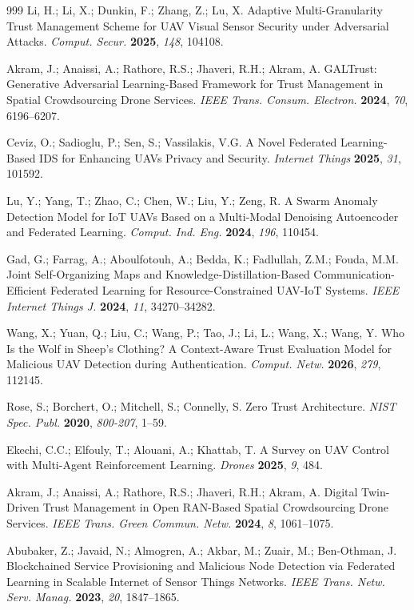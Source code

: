 \documentclass[notspecified,article,submit,moreauthors]{Definitions/mdpi}
\begin{document}
\begin{thebibliography}{999}
Li, H.; Li, X.; Dunkin, F.; Zhang, Z.; Lu, X. Adaptive Multi-Granularity Trust Management Scheme for UAV Visual Sensor Security under Adversarial Attacks. {\em Comput. Secur.} {\bf 2025}, {\em 148}, 104108.

Akram, J.; Anaissi, A.; Rathore, R.S.; Jhaveri, R.H.; Akram, A. GALTrust: Generative Adversarial Learning-Based Framework for Trust Management in Spatial Crowdsourcing Drone Services. {\em IEEE Trans. Consum. Electron.} {\bf 2024}, {\em 70}, 6196--6207.

Ceviz, O.; Sadioglu, P.; Sen, S.; Vassilakis, V.G. A Novel Federated Learning-Based IDS for Enhancing UAVs Privacy and Security. {\em Internet Things} {\bf 2025}, {\em 31}, 101592.

Lu, Y.; Yang, T.; Zhao, C.; Chen, W.; Liu, Y.; Zeng, R. A Swarm Anomaly Detection Model for IoT UAVs Based on a Multi-Modal Denoising Autoencoder and Federated Learning. {\em Comput. Ind. Eng.} {\bf 2024}, {\em 196}, 110454.

Gad, G.; Farrag, A.; Aboulfotouh, A.; Bedda, K.; Fadlullah, Z.M.; Fouda, M.M. Joint Self-Organizing Maps and Knowledge-Distillation-Based Communication-Efficient Federated Learning for Resource-Constrained UAV-IoT Systems. {\em IEEE Internet Things J.} {\bf 2024}, {\em 11}, 34270--34282.

Wang, X.; Yuan, Q.; Liu, C.; Wang, P.; Tao, J.; Li, L.; Wang, X.; Wang, Y. Who Is the Wolf in Sheep's Clothing? A Context-Aware Trust Evaluation Model for Malicious UAV Detection during Authentication. {\em Comput. Netw.} {\bf 2026}, {\em 279}, 112145.

Rose, S.; Borchert, O.; Mitchell, S.; Connelly, S. Zero Trust Architecture. {\em NIST Spec. Publ.} {\bf 2020}, {\em 800-207}, 1--59.

Ekechi, C.C.; Elfouly, T.; Alouani, A.; Khattab, T. A Survey on UAV Control with Multi-Agent Reinforcement Learning. {\em Drones} {\bf 2025}, {\em 9}, 484.

Akram, J.; Anaissi, A.; Rathore, R.S.; Jhaveri, R.H.; Akram, A. Digital Twin-Driven Trust Management in Open RAN-Based Spatial Crowdsourcing Drone Services. {\em IEEE Trans. Green Commun. Netw.} {\bf 2024}, {\em 8}, 1061--1075.

Abubaker, Z.; Javaid, N.; Almogren, A.; Akbar, M.; Zuair, M.; Ben-Othman, J. Blockchained Service Provisioning and Malicious Node Detection via Federated Learning in Scalable Internet of Sensor Things Networks. {\em IEEE Trans. Netw. Serv. Manag.} {\bf 2023}, {\em 20}, 1847--1865.


\end{thebibliography}
\end{document}
